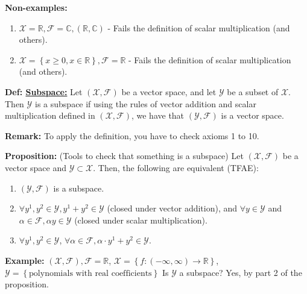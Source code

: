 \documentclass[letterpaper]{article}
\newcommand{\real}{\mathbb R}  %
\newcommand{\cp}{\mathbb C}    %
\begin{document}
\noindent \textbf{Non-examples: }
    \begin{enumerate}
        \item $ \mathcal{X} = \real, \mathcal{F} = \cp, \left(\real,\cp\right) $ - Fails the definition of scalar multiplication (and others).
        \item $ \mathcal{X} = \left\{x\geq 0,x\in\real\right\}, \mathcal{F} = \real $ - Fails the definition of scalar multiplication (and others).
    \end{enumerate}

\noindent \textbf{Def: \underline{Subspace:}} Let $\left(\mathcal{X},\mathcal{F}\right)$ be a vector space, and let $\mathcal{Y}$ be a subset of $\mathcal{X}$. Then $\mathcal{Y}$ is a subspace if using the rules of vector addition and scalar multiplication defined in $\left(\mathcal{X},\mathcal{F}\right)$, we have that $\left(\mathcal{Y},\mathcal{F}\right)$ is a vector space.

\noindent \textbf{Remark: } To apply the definition, you have to check axioms 1 to 10.

\noindent \textbf{Proposition: } (Tools to check that something is a subspace)
Let $\left(\mathcal{X},\mathcal{F}\right)$ be a vector space and $\mathcal{Y}\subset\mathcal{X}$.
Then, the following are equivalent (TFAE):
    \begin{enumerate}
        \item $\left(\mathcal{Y},\mathcal{F}\right)$ is a subspace.
        \item $\forall y^1,y^2\in\mathcal{Y}, y^1+y^2\in\mathcal{Y}$ (closed under vector addition), and $\forall y\in\mathcal{Y}$ and $\alpha\in\mathcal{F},\alpha y\in\mathcal{Y}$ (closed under scalar multiplication).
        \item $\forall y^1,y^2\in\mathcal{Y}$, $\forall \alpha\in\mathcal{F}, \alpha\cdot y^1+y^2 \in \mathcal{Y}$.
    \end{enumerate}

\noindent \textbf{Example: } $\left(\mathcal{X},\mathcal{F}\right), \mathcal{F} = \real$, $\mathcal{X} = \left\{f:\left(-\infty,\infty\right)\to\real\right\}$,
    \newline
    $\mathcal{Y}= \left\{ \mbox{polynomials with real coefficients} \right\}$
    \newline
    Is $\mathcal{Y}$ a subspace? Yes, by part 2 of the proposition.
\end{document}
